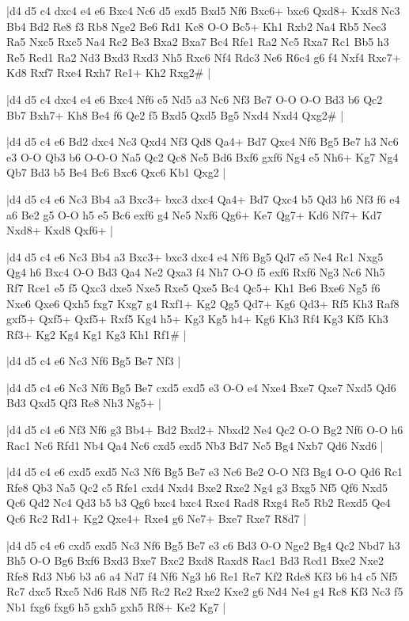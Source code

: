 \whitename{}
\blackname{}
\makegametitle
|d4 d5 c4 dxc4 e4 e6 Bxc4 Nc6 d5 exd5 Bxd5 Nf6 Bxc6+ bxc6 Qxd8+ Kxd8 Nc3 Bb4 Bd2 Re8 f3 Rb8 Nge2 Be6 Rd1 Kc8 O-O Bc5+ Kh1 Rxb2 Na4 Rb5 Nec3 Ra5 Nxc5 Rxc5 Na4 Rc2 Be3 Bxa2 Bxa7 Bc4 Rfe1 Ra2 Nc5 Rxa7 Rc1 Bb5 h3 Re5 Red1 Ra2 Nd3 Bxd3 Rxd3 Nh5 Rxc6 Nf4 Rdc3 Ne6 R6c4 g6 f4 Nxf4 Rxc7+ Kd8 Rxf7 Rxe4 Rxh7 Re1+ Kh2 Rxg2\#  |

\whitename{}
\blackname{}
\makegametitle
|d4 d5 c4 dxc4 e4 e6 Bxc4 Nf6 e5 Nd5 a3 Nc6 Nf3 Be7 O-O O-O Bd3 b6 Qc2 Bb7 Bxh7+ Kh8 Be4 f6 Qe2 f5 Bxd5 Qxd5 Bg5 Nxd4 Nxd4 Qxg2\#  |

\whitename{}
\blackname{}
\makegametitle
|d4 d5 c4 e6 Bd2 dxc4 Nc3 Qxd4 Nf3 Qd8 Qa4+ Bd7 Qxc4 Nf6 Bg5 Be7 h3 Nc6 e3 O-O Qb3 b6 O-O-O Na5 Qc2 Qc8 Ne5 Bd6 Bxf6 gxf6 Ng4 e5 Nh6+ Kg7 Ng4 Qb7 Bd3 b5 Be4 Bc6 Bxc6 Qxc6 Kb1 Qxg2  |

\whitename{}
\blackname{}
\makegametitle
|d4 d5 c4 e6 Nc3 Bb4 a3 Bxc3+ bxc3 dxc4 Qa4+ Bd7 Qxc4 b5 Qd3 h6 Nf3 f6 e4 a6 Be2 g5 O-O h5 e5 Bc6 exf6 g4 Ne5 Nxf6 Qg6+ Ke7 Qg7+ Kd6 Nf7+ Kd7 Nxd8+ Kxd8 Qxf6+  |

\whitename{}
\blackname{}
\makegametitle
|d4 d5 c4 e6 Nc3 Bb4 a3 Bxc3+ bxc3 dxc4 e4 Nf6 Bg5 Qd7 e5 Ne4 Rc1 Nxg5 Qg4 h6 Bxc4 O-O Bd3 Qa4 Ne2 Qxa3 f4 Nh7 O-O f5 exf6 Rxf6 Ng3 Nc6 Nh5 Rf7 Rce1 e5 f5 Qxc3 dxe5 Nxe5 Rxe5 Qxe5 Bc4 Qc5+ Kh1 Be6 Bxe6 Ng5 f6 Nxe6 Qxe6 Qxh5 fxg7 Kxg7 g4 Rxf1+ Kg2 Qg5 Qd7+ Kg6 Qd3+ Rf5 Kh3 Raf8 gxf5+ Qxf5+ Qxf5+ Rxf5 Kg4 h5+ Kg3 Kg5 h4+ Kg6 Kh3 Rf4 Kg3 Kf5 Kh3 Rf3+ Kg2 Kg4 Kg1 Kg3 Kh1 Rf1\#  |

\whitename{}
\blackname{}
\makegametitle
|d4 d5 c4 e6 Nc3 Nf6 Bg5 Be7 Nf3  |

\whitename{}
\blackname{}
\makegametitle
|d4 d5 c4 e6 Nc3 Nf6 Bg5 Be7 cxd5 exd5 e3 O-O e4 Nxe4 Bxe7 Qxe7 Nxd5 Qd6 Bd3 Qxd5 Qf3 Re8 Nh3 Ng5+  |

\whitename{}
\blackname{}
\makegametitle
|d4 d5 c4 e6 Nf3 Nf6 g3 Bb4+ Bd2 Bxd2+ Nbxd2 Ne4 Qc2 O-O Bg2 Nf6 O-O h6 Rac1 Nc6 Rfd1 Nb4 Qa4 Nc6 cxd5 exd5 Nb3 Bd7 Nc5 Bg4 Nxb7 Qd6 Nxd6  |

\whitename{}
\blackname{}
\makegametitle
|d4 d5 c4 e6 cxd5 exd5 Nc3 Nf6 Bg5 Be7 e3 Nc6 Be2 O-O Nf3 Bg4 O-O Qd6 Rc1 Rfe8 Qb3 Na5 Qc2 c5 Rfe1 cxd4 Nxd4 Bxe2 Rxe2 Ng4 g3 Bxg5 Nf5 Qf6 Nxd5 Qc6 Qd2 Nc4 Qd3 b5 b3 Qg6 bxc4 bxc4 Rxc4 Rad8 Rxg4 Re5 Rb2 Rexd5 Qe4 Qc6 Rc2 Rd1+ Kg2 Qxe4+ Rxe4 g6 Ne7+ Bxe7 Rxe7 R8d7  |

\whitename{}
\blackname{}
\makegametitle
|d4 d5 c4 e6 cxd5 exd5 Nc3 Nf6 Bg5 Be7 e3 c6 Bd3 O-O Nge2 Bg4 Qc2 Nbd7 h3 Bh5 O-O Bg6 Bxf6 Bxd3 Bxe7 Bxc2 Bxd8 Raxd8 Rac1 Bd3 Rcd1 Bxe2 Nxe2 Rfe8 Rd3 Nb6 b3 a6 a4 Nd7 f4 Nf6 Ng3 h6 Re1 Re7 Kf2 Rde8 Kf3 b6 h4 c5 Nf5 Rc7 dxc5 Rxc5 Nd6 Rd8 Nf5 Rc2 Re2 Rxe2 Kxe2 g6 Nd4 Ne4 g4 Rc8 Kf3 Nc3 f5 Nb1 fxg6 fxg6 h5 gxh5 gxh5 Rf8+ Ke2 Kg7  |

